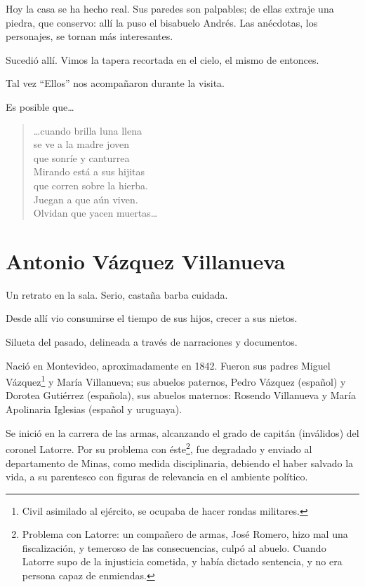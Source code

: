 \documentclass[a4paper]{article}
\begin{document}
Hoy la casa se ha hecho real. Sus paredes son palpables; de ellas extraje una piedra, que conservo: allí la puso el bisabuelo Andrés. Las anécdotas, los personajes, se tornan más interesantes.

Sucedió allí. Vimos la tapera recortada en el cielo, el mismo de entonces.

Tal vez ``Ellos'' nos acompañaron durante la visita.

Es posible que\ldots

\begin{verse}
    \ldots cuando brilla luna llena\\
    se ve a la madre joven\\
    que sonríe y canturrea\\
    Mirando está a sus hijitas\\
    que corren sobre la hierba.\\
    Juegan a que aún viven.\\
    Olvidan que yacen muertas\ldots
\end{verse}

\section{Antonio Vázquez Villanueva}

Un retrato en la sala. Serio, castaña barba cuidada.

Desde allí vio consumirse el tiempo de sus hijos, crecer a sus nietos. 

Silueta del pasado, delineada a través de narraciones y documentos.

Nació en Montevideo, aproximadamente en 1842. Fueron sus padres Miguel Vázquez\footnote{Civil asimilado al ejército, se ocupaba de hacer rondas militares.} y María Villanueva; sus abuelos paternos, Pedro Vázquez (español) y Dorotea Gutiérrez (española), sus abuelos maternos: Rosendo Villanueva y María Apolinaria Iglesias (español y uruguaya).

Se inició en la carrera de las armas, alcanzando el grado de capitán (inválidos) del coronel Latorre. Por su problema con éste\footnote{Problema con Latorre: un compañero de armas, José Romero, hizo mal una fiscalización, y temeroso de las consecuencias, culpó al abuelo. Cuando Latorre supo de la injusticia cometida, y había dictado sentencia, y no era persona capaz de enmiendas.}, fue degradado y enviado al departamento de Minas, como medida disciplinaria, debiendo el haber salvado la vida, a su parentesco con figuras de relevancia en el ambiente político.
\end{document}
